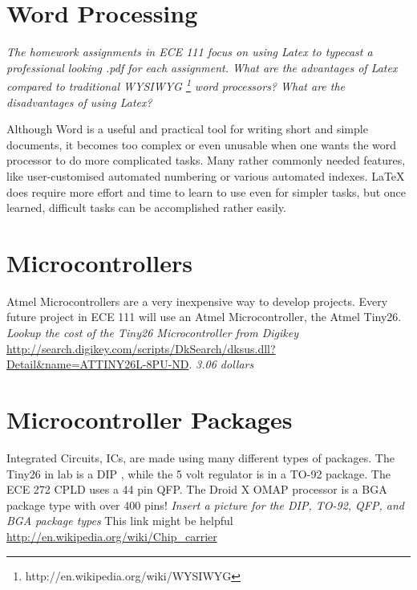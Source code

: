 \documentclass{article}
\begin{document}
\section{Word Processing}
\emph{The homework assignments in ECE 111 focus on using Latex to typecast a professional looking .pdf for each assignment.  What are the advantages of Latex compared to traditional WYSIWYG \footnote{http://en.wikipedia.org/wiki/WYSIWYG} word processors?  What are the disadvantages of using Latex?}\newline\newline

Although Word is a useful and practical tool for writing short and simple documents, it becomes too complex or even unusable when one wants the word processor to do more complicated tasks. Many rather commonly needed features, like user-customised automated numbering or various automated indexes. LaTeX does require more effort and time to learn to use even for simpler tasks, but once learned, difficult tasks can be accomplished rather easily.
 \newline 
\section{Microcontrollers}
Atmel Microcontrollers are a very inexpensive way to develop projects.  Every future project in ECE 111 will use an Atmel Microcontroller, the Atmel Tiny26.\newline
\emph{Lookup the cost of the Tiny26 Microcontroller from Digikey}\newline
\url{http://search.digikey.com/scripts/DkSearch/dksus.dll?Detail&name=ATTINY26L-8PU-ND}.
\newline \newline
\emph{3.06 dollars}\newline






\section{Microcontroller Packages}
Integrated Circuits, ICs, are made using many different types of packages. The Tiny26 in lab is a DIP , while the 5 volt regulator is in a TO-92 package. The ECE 272 CPLD uses a 44 pin QFP. The Droid X OMAP processor is a BGA package type with over 400 pins! \newline
\newline
\emph{Insert a picture for the DIP, TO-92, QFP, and BGA package types}\newline
\newline
This link might be helpful \newline
\newline
\url{http://en.wikipedia.org/wiki/Chip_carrier}\newline
\newline
\end{document}
